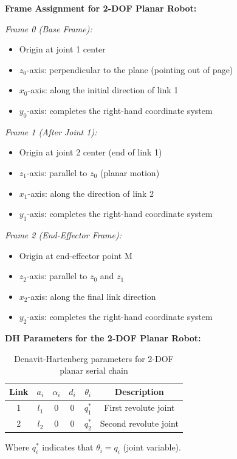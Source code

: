 \documentclass[11pt,a4paper]{article}
\begin{document}
\textbf{Frame Assignment for 2-DOF Planar Robot:}

\textit{Frame 0 (Base Frame):}
\begin{itemize}
    \item Origin at joint 1 center
    \item $z_0$-axis: perpendicular to the plane (pointing out of page)
    \item $x_0$-axis: along the initial direction of link 1
    \item $y_0$-axis: completes the right-hand coordinate system
\end{itemize}

\textit{Frame 1 (After Joint 1):}
\begin{itemize}
    \item Origin at joint 2 center (end of link 1)
    \item $z_1$-axis: parallel to $z_0$ (planar motion)
    \item $x_1$-axis: along the direction of link 2
    \item $y_1$-axis: completes the right-hand coordinate system
\end{itemize}

\textit{Frame 2 (End-Effector Frame):}
\begin{itemize}
    \item Origin at end-effector point M
    \item $z_2$-axis: parallel to $z_0$ and $z_1$
    \item $x_2$-axis: along the final link direction
    \item $y_2$-axis: completes the right-hand coordinate system
\end{itemize}

\textbf{DH Parameters for the 2-DOF Planar Robot:}
\begin{table}[h]
\centering
\begin{tabular}{|c|c|c|c|c|c|}
\hline
Link & $a_i$ & $\alpha_i$ & $d_i$ & $\theta_i$ & Description \\
\hline
1 & $l_1$ & $0$ & $0$ & $q_1^*$ & First revolute joint \\
2 & $l_2$ & $0$ & $0$ & $q_2^*$ & Second revolute joint \\
\hline
\end{tabular}
\caption{Denavit-Hartenberg parameters for 2-DOF planar serial chain}
\label{tab:dh_parameters}
\end{table}

Where $q_i^*$ indicates that $\theta_i = q_i$ (joint variable).
\end{document}
